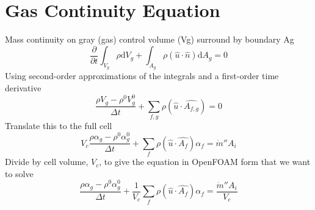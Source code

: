 \documentclass{article}
\renewcommand{\vec}[1]{\ensuremath{\hat{#1}}}
\renewcommand{\d}{\mathrm{d}}
\begin{document}
  \section{Gas Continuity Equation}
    Mass continuity on gray (gas) control volume (Vg) surround by boundary Ag
    \begin{equation*}
        \frac{\partial}{\partial t}\int_{V_g} \rho \d V_g 
      + \int_{A_g} \rho (\vec{u} \cdot \vec{n}) \d A_g
      = 0
    \end{equation*}
    Using second-order approximations of the integrals and a first-order time derivative
    \begin{equation*}
        \frac{\rho V_g - \rho^0 V_g^0}{\Delta t}
      + \sum_{f,g}\rho(\vec{u}\cdot\vec{A_{f,g}})
      = 0
    \end{equation*}
    Translate this to the full cell
    \begin{equation*}
        V_c\frac{\rho \alpha_g - \rho^0 \alpha_g^0}{\Delta t}
      + \sum_{f}\rho(\vec{u}\cdot\vec{A_{f}})\alpha_f
      = \dot{m}'' A_i
    \end{equation*}
    Divide by cell volume, $V_c$, to give the equation in OpenFOAM form that we want to solve
    \begin{equation}
      \label{eq:gasCont}
      \boxed{
        \frac{\rho \alpha_g - \rho^0 \alpha_g^0}{\Delta t}
      + \frac{1}{V_c}\sum_{f}\rho (\vec{u}\cdot\vec{A_{f}})\alpha_f
      = \frac{\dot{m}'' A_i}{V_c}
      }
    \end{equation}
\end{document}
